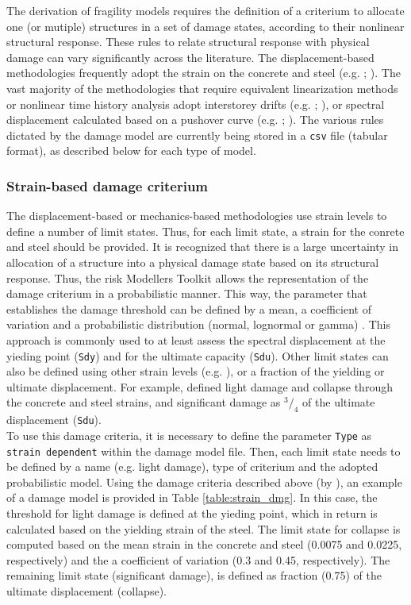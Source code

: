 The derivation of fragility models requires the definition of a criterium to allocate one (or mutiple) structures in a set of damage states, according to their nonlinear structural response. These rules to relate structural response with physical damage can vary significantly across the literature. The displacement-based methodologies frequently adopt the strain on the concrete and steel (e.g. \cite{BorziEtAl2008b}; \cite{SilvaEtAl2013}). The vast majority of the methodologies that require equivalent linearization methods or nonlinear time history analysis adopt interstorey drifts (e.g. \cite{VamvatsikosCornell2005}; \cite{RossettoElnashai2005}), or spectral displacement calculated based on a pushover curve (e.g. \cite{Erberik2008}; \cite{SilvaEtAl2014c}). The various rules dictated by the damage model are currently being stored in a \verb=csv= file (tabular format), as described below for each type of model.

\subsubsection{Strain-based damage criterium}
\label{subsubsec:strain-dmg}
The displacement-based \citep{CrowleyEtAl2004} or mechanics-based \citep{BorziEtAl2008b} methodologies use strain levels to define a number of limit states. Thus, for each limit state, a strain for the conrete and steel should be provided. It is recognized that there is a large uncertainty in allocation of a structure into a physical damage state based on its structural response. Thus, the risk Modellers Toolkit allows the representation of the damage criterium in a probabilistic manner. This way, the parameter that establishes the damage threshold can be defined by a mean, a coefficient of variation and a probabilistic distribution (normal, lognormal or gamma) \citep{SilvaEtAl2013}. This approach is commonly used to at least assess the spectral displacement at the yieding point (\verb=Sdy=) and for the ultimate capacity (\verb=Sdu=). Other limit states can also be defined using other strain levels (e.g. \cite{CrowleyEtAl2004}), or a fraction of the yielding or ultimate displacement. For example, \cite{BorziEtAl2008b} defined light damage and collapse through the concrete and steel strains, and significant damage as $^3/_4$ of the ultimate displacement (\verb=Sdu=).\\

To use this damage criteria, it is necessary to define the parameter \verb=Type= as \verb=strain dependent= within the damage model file. Then, each limit state needs to be defined by a name (e.g. light damage), type of criterium and the adopted probabilistic model. Using the damage criteria described above (by \cite{BorziEtAl2008b}), an example of a damage model is provided in Table \ref{table:strain_dmg}. In this case, the threshold for light damage is defined at the yieding point, which in return is calculated based on the yielding strain of the steel. The limit state for collapse is computed based on the mean strain in the concrete and steel (0.0075 and 0.0225, respectively) and the a coefficient of variation (0.3 and 0.45, respectively). The remaining limit state (significant damage), is defined as fraction (0.75) of the ultimate displacement (collapse).

